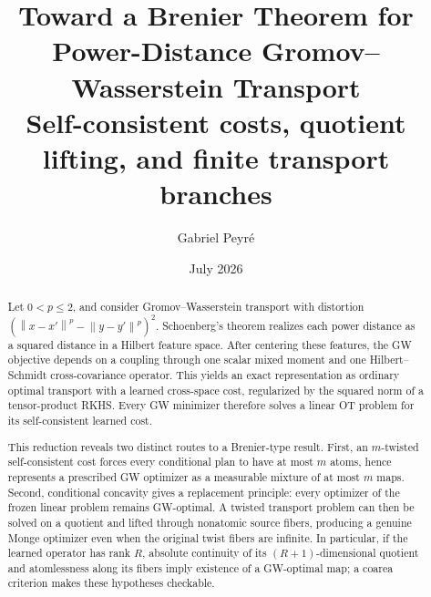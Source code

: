 \documentclass[11pt,a4paper]{article}
\title{\textbf{Toward a Brenier Theorem for\\
Power-Distance Gromov--Wasserstein Transport}\\
\large Self-consistent costs, quotient lifting, and finite transport branches}
\author{Gabriel Peyr\'e}
\date{July 2026}
\theoremstyle{definition}
\theoremstyle{remark}
\newcommand{\norm}[1]{\left\lVert #1\right\rVert}
\begin{document}
\maketitle

\begin{abstract}
Let \(0<p\leq2\), and consider Gromov--Wasserstein transport with distortion
\(
 (\norm{x-x'}^p-\norm{y-y'}^p)^2.
\)
Schoenberg's theorem realizes each power distance as a squared distance in a
Hilbert feature space.  After centering these features, the GW objective
depends on a coupling through one scalar mixed moment and one Hilbert--Schmidt
cross-covariance operator.  This yields an exact representation as ordinary
optimal transport with a learned cross-space cost, regularized by the squared
norm of a tensor-product RKHS.  Every GW minimizer therefore solves a linear
OT problem for its self-consistent learned cost.

This reduction reveals two distinct routes to a Brenier-type result.  First,
an \(m\)-twisted self-consistent cost forces every conditional plan to have at
most \(m\) atoms, hence represents a prescribed GW optimizer as a measurable
mixture of at most \(m\) maps.  Second, conditional concavity gives a
replacement principle: every optimizer of the frozen linear problem remains
GW-optimal.  A twisted transport problem can then be solved on a quotient and
lifted through nonatomic source fibers, producing a genuine Monge optimizer
even when the original twist fibers are infinite.  In particular, if the
learned operator has rank \(R\), absolute continuity of its
\((R+1)\)-dimensional quotient and atomlessness along its fibers imply
existence of a GW-optimal map; a coarea criterion makes these hypotheses
checkable.


\end{abstract}
\end{document}
